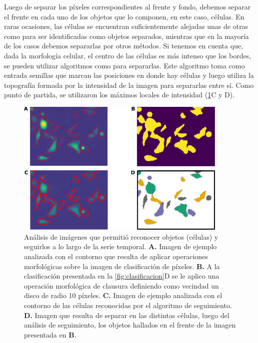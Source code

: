 Luego de separar los píxeles correspondientes al frente y fondo, debemos separar el frente en cada uno de los objetos que lo componen, en este caso, células. En raras ocasiones, las células se encuentran suficientemente alejadas unas de otras como para ser identificadas como objetos separados, mientras que en la mayoría de los casos debemos separarlas por otros métodos. Si tenemos en cuenta que, dada la morfología celular, el centro de las células es más intenso que los bordes, se pueden utilizar algoritmos como  para separarlas. Este algoritmo toma como entrada semillas que marcan las posiciones en donde hay células y luego utiliza la topografía formada por la intensidad de la imagen para separarlas entre sí. Como punto de partida, se utilizaron los máximos locales de intensidad (\cref{fig:seguimiento}C y D).

\begin{figure}[htb]
    \centering
    \includegraphics[width=0.9\textwidth]{img/cap_2/seguimiento.pdf}
    \caption{\footnotesize{Análisis de imágenes que permitió reconocer objetos (células) y seguirlos a lo largo de la serie temporal. \textbf{A.} Imagen de ejemplo analizada con el contorno que resulta de aplicar operaciones morfológicas sobre la imagen de clasificación de píxeles. \textbf{B.} A la clasificación presentada en la \cref{fig:clasificacion}D se le aplico una operación morfológica de clausura definiendo como vecindad un disco de radio 10 píxeles. \textbf{C.} Imagen de ejemplo analizada con el contorno de las células reconocidas por el algoritmo de seguimiento. \textbf{D.} Imagen que resulta de separar en las distintas células, luego del análisis de seguimiento, los objetos hallados en el frente de la imagen presentada en \textbf{B}.}}
    \label{fig:seguimiento}
\end{figure}

